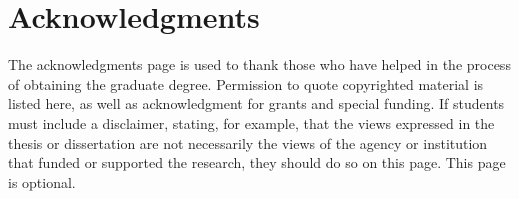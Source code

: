 \chapter*{Acknowledgments} \label{acknowledgments}

The acknowledgments page is used to thank those who have helped in the
process of obtaining the graduate degree. Permission to quote copyrighted
material is listed here, as well as acknowledgment for grants and
special funding. If students must include a disclaimer, stating, for example,
that the views expressed in the thesis or dissertation are not necessarily
the views of the agency or institution that funded or supported the research,
they should do so on this page. This page is optional.
